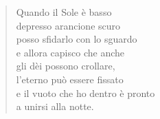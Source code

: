 
\begin{verse}
    Quando il Sole è basso\\
    depresso arancione scuro\\
    posso sfidarlo con lo sguardo\\
    e allora capisco che anche\\
    gli dèi possono crollare,\\
    l'eterno può essere fissato\\
    e il vuoto che ho dentro è pronto\\
    a unirsi alla notte.
\end{verse}